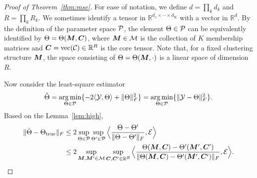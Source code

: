 \documentclass{article}
\begin{document}
\begin{appendices}
\begin{proof}[Proof of Theorem~\ref{thm:mse}]
For ease of notation, we define $d=\prod_k d_k$ and $R=\prod_k R_k$. We sometimes identify a tensor in $\mathbb{R}^{d_1\times \cdots \times d_K}$ with a vector in $\mathbb{R}^d$. By the definition of the parameter space $\mathcal{P}$, the element $\Theta\in \mathcal{P}$ can be equivalently identified by $\Theta=\Theta(\bm M, \bm C)$, where $\bm M\in \mathcal{M}$ is the collection of $K$ membership matrices and $\bm C=\text{vec}(\mathcal{C})\in\mathbb{R}^R$ is the core tensor. Note that, for a fixed clustering structure $\bm M$, the space consisting of $\Theta=\Theta(\bm M,\cdot)$ is a linear space of dimension $R$. 




Now consider the least-square estimator
\[
\hat \Theta=\operatorname*{arg\,min}_{\Theta\in\mathcal{P}}\{-2\langle \mathcal{Y}, \Theta\rangle+\lVert\Theta\rVert_F^2 \}=\operatorname*{arg\,min}_{\Theta\in\mathcal{P}}\{\lVert\mathcal{Y}-\Theta\rVert_F^2 \}.
\]
Based on the Lemma~\ref{lem:high},
\begin{equation}
\begin{split}
\lVert\hat \Theta-\Theta_{\text{true}}\rVert_F&\leq 2\sup_{\Theta\in\mathcal{P}} \sup_{\Theta'\in \mathcal{P}} \Big\langle {\Theta-\Theta'\over \lVert\Theta-\Theta'\rVert_F}, \mathcal{E} \Big\rangle\\
&\leq 2\sup_{\bm M, \bm M' \in \mathcal{M}}\sup_{\bm C, \bm C' \in \mathbb{R}^R}\Big\langle {\Theta(\bm M, \bm C)-\Theta'(\bm M', \bm C')\over \lVert\Theta(\bm M, \bm C)-\Theta' (\bm M', \bm C')\rVert_F}, \mathcal{E} \Big\rangle.
\end{split}
\end{equation}


\end{proof}
\end{appendices}
\end{document}

